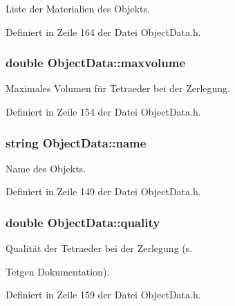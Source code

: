Liste der Materialien des Objekts. 



Definiert in Zeile 164 der Datei Object\-Data.\-h.

\hypertarget{classObjectData_a5cc67da17022ec0f6eed6d02fa975a8b}{
\subsubsection[{maxvolume}]{\setlength{\rightskip}{0pt plus 5cm}double Object\-Data\-::maxvolume\hspace{0.3cm}{\ttfamily [private]}}}\label{classObjectData_a5cc67da17022ec0f6eed6d02fa975a8b}


Maximales Volumen für Tetraeder bei der Zerlegung. 



Definiert in Zeile 154 der Datei Object\-Data.\-h.

\hypertarget{classObjectData_a6d900f11952e9d50e6660a3695fad99d}{
\subsubsection[{name}]{\setlength{\rightskip}{0pt plus 5cm}string Object\-Data\-::name\hspace{0.3cm}{\ttfamily [private]}}}\label{classObjectData_a6d900f11952e9d50e6660a3695fad99d}


Name des Objekts. 



Definiert in Zeile 149 der Datei Object\-Data.\-h.

\hypertarget{classObjectData_ae047918932000aca3ff1bc680b288c08}{
\subsubsection[{quality}]{\setlength{\rightskip}{0pt plus 5cm}double Object\-Data\-::quality\hspace{0.3cm}{\ttfamily [private]}}}\label{classObjectData_ae047918932000aca3ff1bc680b288c08}


Qualität der Tetraeder bei der Zerlegung (s. 

Tetgen Dokumentation). 

Definiert in Zeile 159 der Datei Object\-Data.\-h.


